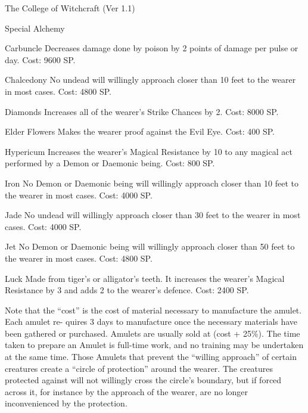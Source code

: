\begin{Chapter}{The College of Witchcraft (Ver 1.1)}
\begin{talent}[T-2]{Special Alchemy}
\begin{effects}
\begin{Description}
\begin{Description}
\item[Carbuncle] Decreases damage done by poison by 2 points of damage
  per pulse or day. Cost: 9600 SP.

\item[Chalcedony] No undead will willingly approach closer than 10
  feet to the wearer in most cases.  Cost: 4800 SP.

\item[Diamonds] Increases all of the wearer’s Strike Chances by
  2. Cost: 8000 SP.

\item[Elder Flowers] Makes the wearer proof against the Evil
  Eye. Cost: 400 SP.

\item[Hypericum] Increases the wearer’s Magical Resistance by 10 to
  any magical act performed by a Demon or Daemonic being. Cost: 800
  SP.

\item[Iron] No Demon or Daemonic being will willingly approach closer
  than 10 feet to the wearer in most cases. Cost: 4000 SP.

\item[Jade] No undead will willingly approach closer than 30 feet to
  the wearer in most cases. Cost: 4000 SP.

\item[Jet] No Demon or Daemonic being will willingly approach closer
  than 50 feet to the wearer in most cases. Cost: 4800 SP.

\item[Luck] Made from tiger’s or alligator’s teeth.  It increases the
  wearer’s Magical Resistance by 3 and adds 2 to the wearer’s
  defence. Cost: 2400 SP.
\end{Description}
Note that the “cost” is the cost of material necessary to manufacture
the amulet.  Each amulet re- quires 3 days to manufacture once the
necessary materials have been gathered or purchased.  Amulets are
usually sold at (cost + 25\%).  The time taken to prepare an Amulet is
full-time work, and no training may be undertaken at the same time.
Those Amulets that prevent the “willing approach” of certain creatures
create a “circle of protection” around the wearer. The creatures
protected against will not willingly cross the circle’s boundary, but
if forced across it, for instance by the approach of the wearer, are
no longer inconvenienced by the protection.


\end{Description}
\end{effects}
\end{talent}
\end{Chapter}
